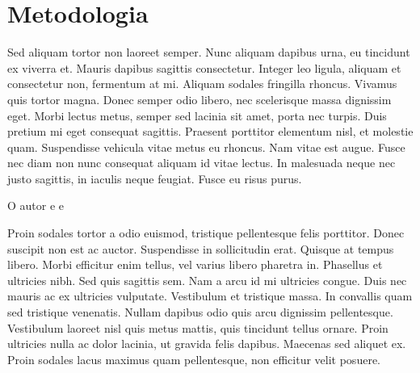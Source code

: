 \chapter{Metodologia}
\label{chap:metodologia}

Sed aliquam tortor non laoreet semper. Nunc aliquam dapibus urna, eu tincidunt ex viverra et. Mauris dapibus sagittis consectetur. Integer leo ligula, aliquam et consectetur non, fermentum at mi. Aliquam sodales fringilla rhoncus. Vivamus quis tortor magna. Donec semper odio libero, nec scelerisque massa dignissim eget. Morbi lectus metus, semper sed lacinia sit amet, porta nec turpis. Duis pretium mi eget consequat sagittis. Praesent porttitor elementum nisl, et molestie quam. Suspendisse vehicula vitae metus eu rhoncus. Nam vitae est augue. Fusce nec diam non nunc consequat aliquam id vitae lectus. In malesuada neque nec justo sagittis, in iaculis neque feugiat. Fusce eu risus purus.

O autor \cite{lamport1986latex} e \cite{Maia2011} e \cite{ibge23} 

Proin sodales tortor a odio euismod, tristique pellentesque felis porttitor. Donec suscipit non est ac auctor. Suspendisse in sollicitudin erat. Quisque at tempus libero. Morbi efficitur enim tellus, vel varius libero pharetra in. Phasellus et ultricies nibh. Sed quis sagittis sem. Nam a arcu id mi ultricies congue. Duis nec mauris ac ex ultricies vulputate. Vestibulum et tristique massa. In convallis quam sed tristique venenatis. Nullam dapibus odio quis arcu dignissim pellentesque. Vestibulum laoreet nisl quis metus mattis, quis tincidunt tellus ornare. Proin ultricies nulla ac dolor lacinia, ut gravida felis dapibus. Maecenas sed aliquet ex. Proin sodales lacus maximus quam pellentesque, non efficitur velit posuere.

\begin{table}[ht!]
\end{table}


